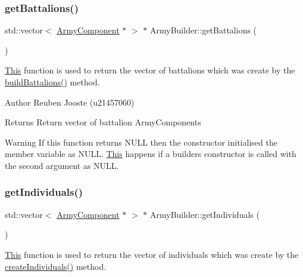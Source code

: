 \subsubsection{\texorpdfstring{getBattalions()}{getBattalions()}}
{\footnotesize\ttfamily std\+::vector$<$ \mbox{\hyperlink{class_army_component}{Army\+Component}} $\ast$ $>$ $\ast$ Army\+Builder\+::get\+Battalions (\begin{DoxyParamCaption}{ }\end{DoxyParamCaption})}



\mbox{\hyperlink{class_this}{This}} function is used to return the vector of battalions which was create by the \mbox{\hyperlink{class_army_builder_a4ff1c6808926f65820eceaf9adab2c16}{build\+Battalions()}} method. 

\begin{DoxyAuthor}{Author}
Reuben Jooste (u21457060) 
\end{DoxyAuthor}
\begin{DoxyReturn}{Returns}
Return vector of battalion Army\+Components 
\end{DoxyReturn}
\begin{DoxyWarning}{Warning}
If this function returns N\+U\+LL then the constructor initialised the member variable as N\+U\+LL. \mbox{\hyperlink{class_this}{This}} happens if a builder\textquotesingle{}s constructor is called with the second argument as N\+U\+LL. 
\end{DoxyWarning}
\mbox{\label{class_army_builder_acfd27d8925670504e95c8cc62b560dfb}} 
\subsubsection{\texorpdfstring{getIndividuals()}{getIndividuals()}}
{\footnotesize\ttfamily std\+::vector$<$ \mbox{\hyperlink{class_army_component}{Army\+Component}} $\ast$ $>$ $\ast$ Army\+Builder\+::get\+Individuals (\begin{DoxyParamCaption}{ }\end{DoxyParamCaption})}



\mbox{\hyperlink{class_this}{This}} function is used to return the vector of individuals which was create by the \mbox{\hyperlink{class_army_builder_aefae08ee6f43f41d94d06891ad6fdbbb}{create\+Individuals()}} method. 

